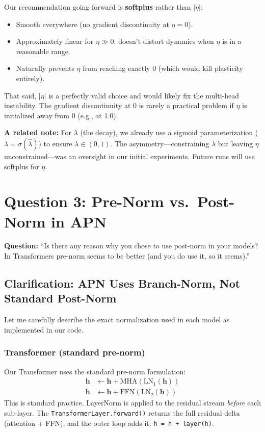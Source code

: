 \documentclass[11pt,a4paper]{article}
\begin{document}
Our recommendation going forward is \textbf{softplus} rather than $|\eta|$:
\begin{itemize}
\item Smooth everywhere (no gradient discontinuity at $\eta = 0$).
\item Approximately linear for $\eta \gg 0$: doesn't distort dynamics when $\eta$ is in a reasonable range.
\item Naturally prevents $\eta$ from reaching exactly 0 (which would kill plasticity entirely).
\end{itemize}

That said, $|\eta|$ is a perfectly valid choice and would likely fix the multi-head instability.
The gradient discontinuity at 0 is rarely a practical problem if $\eta$ is initialized away from 0 (e.g., at 1.0).

\textbf{A related note:} For $\lambda$ (the decay), we already use a sigmoid parameterization ($\lambda = \sigma(\hat{\lambda})$) to ensure $\lambda \in (0,1)$.
The asymmetry---constraining $\lambda$ but leaving $\eta$ unconstrained---was an oversight in our initial experiments.
Future runs will use softplus for $\eta$.

\section{Question 3: Pre-Norm vs.\ Post-Norm in APN}

\textbf{Question:} ``Is there any reason why you chose to use post-norm in your models? In Transformers pre-norm seems to be better (and you do use it, so it seems).''

\subsection{Clarification: APN Uses Branch-Norm, Not Standard Post-Norm}

Let me carefully describe the exact normalization used in each model as implemented in our code.

\subsubsection{Transformer (standard pre-norm)}

Our Transformer uses the standard pre-norm formulation:
\begin{align}
\mathbf{h} &\leftarrow \mathbf{h} + \text{MHA}(\text{LN}_1(\mathbf{h})) \\
\mathbf{h} &\leftarrow \mathbf{h} + \text{FFN}(\text{LN}_2(\mathbf{h}))
\end{align}
This is standard practice. LayerNorm is applied to the residual stream \emph{before} each sub-layer. The \texttt{TransformerLayer.forward()} returns the full residual delta (attention + FFN), and the outer loop adds it: \texttt{h = h + layer(h)}.
\end{document}
